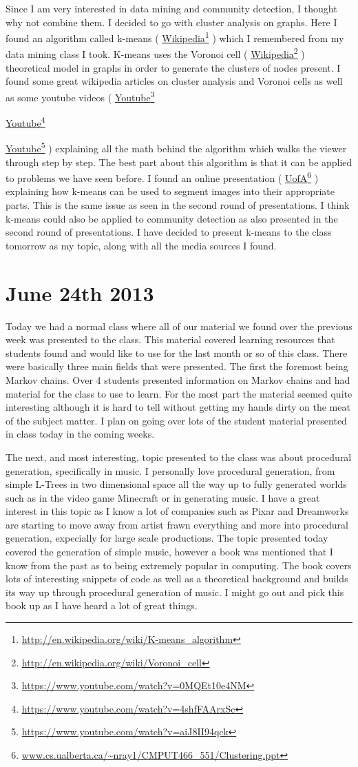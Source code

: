 \documentclass[conference]{IEEEtran}
\newcommand\fnurl[2]{%
  \href{#2}{#1}\footnote{\url{#2}}%
}
\begin{document}
Since I am very interested in data mining and community detection, I thought why not combine them.
I decided to go with cluster analysis on graphs. Here I found an algorithm called 
k-means (\fnurl{Wikipedia}{http://en.wikipedia.org/wiki/K-means_algorithm}) which I
remembered from my data mining class I took. K-means uses the 
Voronoi cell (\fnurl{Wikipedia}{http://en.wikipedia.org/wiki/Voronoi_cell}) theoretical model in graphs
in order to generate the clusters of nodes present. I found some great wikipedia articles on cluster
analysis and Voronoi cells as well as some 
youtube videos (\fnurl{Youtube}{https://www.youtube.com/watch?v=0MQEt10e4NM}
\fnurl{Youtube}{https://www.youtube.com/watch?v=4shfFAArxSc}
\fnurl{Youtube}{https://www.youtube.com/watch?v=aiJ8II94qck}) 
explaining all the math behind the algorithm
which walks the viewer through step by step. The best part about this algorithm is that it can be applied
to problems we have seen before. I found an online 
presentation (\fnurl{UofA}{www.cs.ualberta.ca/~nray1/CMPUT466_551/Clustering.ppt‎}) explaining how k-means can be used to
segment images into their appropriate parts. This is the same issue as seen in the second round of 
presentations. I think k-means could also be applied to community detection as also presented in the
second round of presentations. I have decided to present k-means to the class tomorrow as my topic,
along with all the media sources I found.

\section{June 24th 2013}
Today we had a normal class where all of our material we found over the previous week was presented to
the class. This material covered learning resources that students found and would like to use for the last
month or so of this class. There were basically three main fields that were presented. The first the foremost
being Markov chains. Over 4 students presented information on Markov chains and had material for the class
to use to learn. For the most part the material seemed quite interesting although it is hard to tell without
getting my hands dirty on the meat of the subject matter. I plan on going over lots of the student material
presented in class today in the coming weeks.

The next, and most interesting, topic presented to the class was about procedural generation, specifically
in music. I personally love procedural generation, from simple L-Trees in two dimensional space all the way up
to fully generated worlds such as in the video game Minecraft or in generating music. I have a great interest
in this topic as I know a lot of companies such as Pixar and Dreamworks are starting to move away from artist
frawn everything and more into procedural generation, expecially for large scale productions. The topic presented
today covered the generation of simple music, however a book was mentioned that I know from the past as to being
extremely popular in computing. The book covers lots of interesting snippets of code as well as a theoretical
background and builds its way up through procedural generation of music. I might go out and pick this book up
as I have heard a lot of great things.
\end{document}
